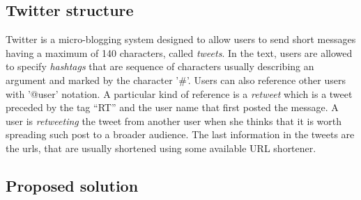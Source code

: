 \subsection{Twitter structure}
Twitter is a micro-blogging system designed to allow users to send short messages having a maximum of 140 characters, called \textit{tweets}. 
In the text, users are allowed to specify \textit{hashtags} that are sequence of characters usually describing an argument and marked by the character '\#'. 
Users can also reference other users with '@user' notation. 
A particular kind of reference is a \textit{retweet} which is a tweet preceded by the tag ``RT'' and the user name that first posted the message. 
A user is \emph{retweeting} the tweet from another user when she thinks that it is worth spreading such post to a broader audience.
The last information in the tweets are the urls, that are usually shortened using some available URL shortener. 

\subsection{Proposed solution}


